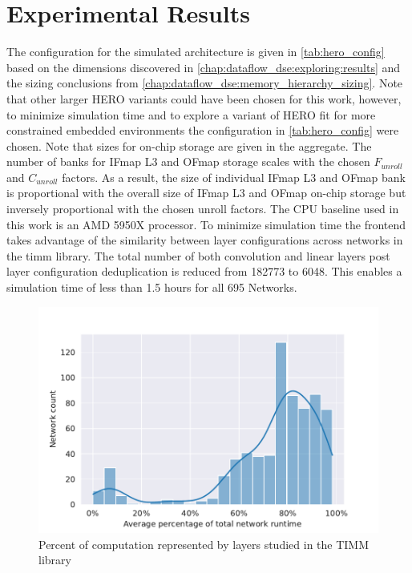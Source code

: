 \section{Experimental Results}
\label{chap:hero:results}

The configuration for the simulated architecture is given in
\autoref{tab:hero_config} based on the dimensions discovered in
\autoref{chap:dataflow_dse:exploring:results} and the sizing conclusions from
\autoref{chap:dataflow_dse:memory_hierarchy_sizing}. Note that other larger HERO
variants could have been chosen for this work, however, to minimize simulation
time and to explore a variant of HERO fit for more constrained embedded
environments the configuration in \autoref{tab:hero_config} were chosen.   
Note that sizes for on-chip
storage are given in the aggregate. The number of banks for IFmap L3 and OFmap
storage scales with the chosen $F_{unroll}$ and $C_{unroll}$ factors. As a
result, the size of individual IFmap L3 and OFmap bank is proportional with the
overall size of IFmap L3 and OFmap on-chip storage but inversely proportional
with the chosen unroll factors. The CPU baseline used in this work is an AMD
5950X processor. To minimize simulation time the frontend takes advantage of the
similarity between layer configurations across networks in the timm library.
The total number of both convolution and linear layers post layer configuration
deduplication is reduced from 182773 to 6048. This enables a simulation time of
less than 1.5 hours for all 695 Networks.

\begin{figure}[ht]
    \centering
    \includegraphics[scale=0.58]{Plots/overview/percent.pdf}
    \caption{Percent of computation represented by layers studied in the TIMM library}
    \label{fig:percent_of_compute}
\end{figure}

